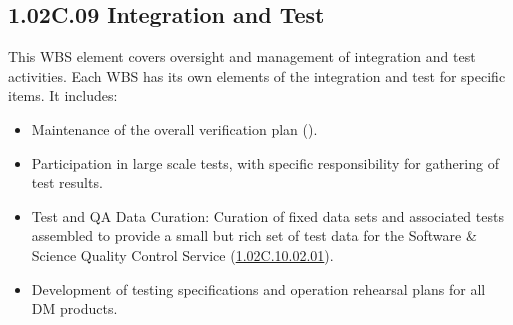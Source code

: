 \subsection{1.02C.09 Integration and Test}

This WBS element covers oversight and management of integration and test activities. Each WBS has its own elements of the integration and test for specific items. It includes:

\begin{itemize}

\item{Maintenance of the overall verification plan ().}

\item{Participation in large scale tests, with specific responsibility for
gathering of test results.}

\item{Test and QA Data Curation: Curation of fixed data sets and associated
tests assembled to provide a small but rich set of test data for the Software
\& Science Quality Control Service
(\hyperref[wbs:1.02C.10.02.01]{1.02C.10.02.01}).}

\item{Development of testing specifications and operation rehearsal plans for
all DM products.}

\end{itemize}


